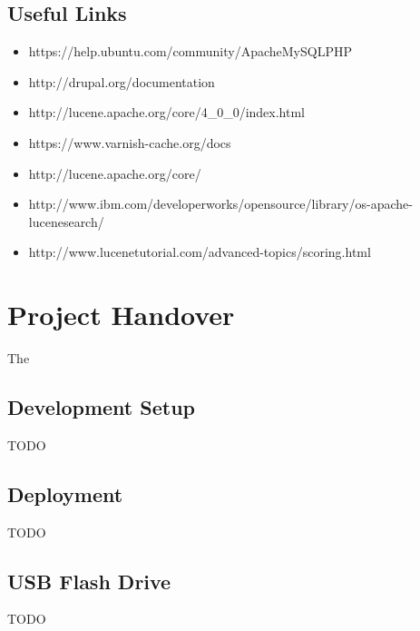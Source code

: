 \documentclass[11pt]{article} %
\begin{document}
\subsection{Useful Links}

\begin{itemize}
\item https://help.ubuntu.com/community/ApacheMySQLPHP
\item http://drupal.org/documentation
\item http://lucene.apache.org/core/4\_0\_0/index.html
\item https://www.varnish-cache.org/docs
\item http://lucene.apache.org/core/
\item http://www.ibm.com/developerworks/opensource/library/os-apache-lucenesearch/
\item http://www.lucenetutorial.com/advanced-topics/scoring.html
\end{itemize}

\section{Project Handover}

The 

\subsection{Development Setup}

TODO

\subsection{Deployment}

TODO

\subsection{USB Flash Drive}

TODO
\end{document}

